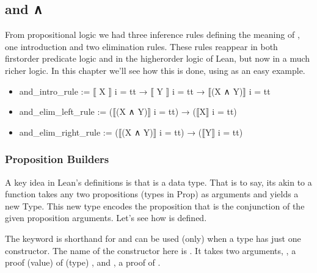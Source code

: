 \documentclass[letterpaper,10pt,english]{sphinxmanual}
\begin{document}
\subsection{and ∧}
\label{\detokenize{A_02_Constructive_Logic:and}}
\sphinxAtStartPar
From propositional logic we had three inference rules defining
the meaning of , one introduction and two elimination rules.
These rules re\sphinxhyphen{}appear in both first\sphinxhyphen{}order predicate logic and in
the higher\sphinxhyphen{}order logic of Lean, but now in a much richer logic.
In this chapter we’ll see how this is done, using  as an
easy example.
\begin{itemize}
\item {} 
\sphinxAtStartPar
and\_intro\_rule := ⟦ X ⟧ i = tt → ⟦ Y ⟧ i = tt → ⟦(X ∧ Y)⟧ i = tt

\item {} 
\sphinxAtStartPar
and\_elim\_left\_rule := (⟦(X ∧ Y)⟧ i = tt) → (⟦X⟧ i = tt)

\item {} 
\sphinxAtStartPar
and\_elim\_right\_rule := (⟦(X ∧ Y)⟧ i = tt) → (⟦Y⟧ i = tt)

\end{itemize}


\subsubsection{Proposition Builders}
\label{\detokenize{A_02_Constructive_Logic:proposition-builders}}
\sphinxAtStartPar
A key idea in Lean’s definitions is that  is a 
data type. That is to say, its akin to a function takes any two
propositions (types in Prop) as arguments and yields a new Type.
This new type encodes the proposition that is the conjunction of
the given proposition arguments. Let’s see how  is defined.

\begin{sphinxVerbatim}[commandchars=\\\{\}]
        
       
\end{sphinxVerbatim}

\sphinxAtStartPar
The  keyword is shorthand for  and can be
used (only) when a type has just one constructor. The name of the
constructor here is . It takes two arguments, , a
proof (value) of (type) , and , a proof of .
\end{document}
